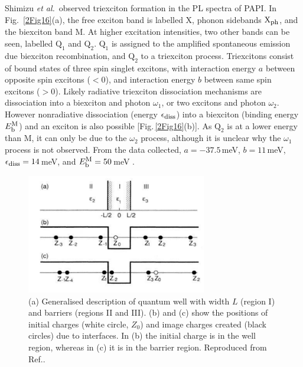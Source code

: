Shimizu \textit{et al.}\ observed triexciton formation in the PL spectra of PAPI. In Fig.\ \ref{2Fig16}(a), the free exciton band is labelled X, phonon sidebands $\textrm{X}_{\textrm{\footnotesize ph}}$, and the biexciton band M. At higher excitation intensities, two other bands can be seen, labelled $\textrm{Q}_1$ and $\textrm{Q}_2$. $\textrm{Q}_1$ is assigned to the amplified spontaneous emission due biexciton recombination, and $\textrm{Q}_2$ to a triexciton process. Triexcitons consist of bound states of three spin singlet excitons, with interaction energy $a$ between opposite spin excitons ($<0$), and interaction energy $b$ between same spin excitons ($>0$). Likely radiative triexciton dissociation mechanisms are dissociation into a biexciton and photon $\omega_1$, or two excitons and photon $\omega_2$. However nonradiative dissociation (energy $\epsilon_{\textrm{\footnotesize diss}}$) into a biexciton (binding energy $E_{\textrm{\footnotesize b}}^{\textrm{\footnotesize M}}$) and an exciton is also possible [Fig.\,\ref{2Fig16}(b)]. As $\textrm{Q}_2$ is at a lower energy than M, it can only be due to the $\omega_2$ process, although it is unclear why the $\omega_1$ process is not observed. From the data collected, $a=-37.5$\,meV, $b=11$\,meV, $\epsilon_{\textrm{\footnotesize diss}}=14$\,meV, and $E_{\textrm{\footnotesize b}}^{\textrm{\footnotesize M}}=50$\,meV \cite{Shimizu2006a}. 

\begin{figure}[h!]
\centering
\includegraphics[width=0.7\textwidth]{Fig17}
\caption{(a) Generalised description of quantum well with width $L$ (region I) and barriers (regions II and III). (b) and (c) show the positions of initial charges (white circle, $Z_0$) and image charges created (black circles) due to interfaces. In (b) the initial charge is in the well region, whereas in (c) it is in the barrier region. Reproduced from Ref.\!.}
\label{2Fig17}
\end{figure}
